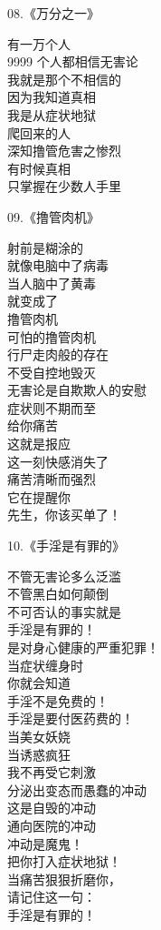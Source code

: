 \begin{multicols}{2}
    \begin{center}
        08.《万分之一》\it

        有一万个人 \\ 9999 个人都相信无害论 \\ 我就是那个不相信的 \\ 因为我知道真相 \\ 我是从症状地狱 \\ 爬回来的人 \\ 深知撸管危害之惨烈 \\ 有时候真相 \\ 只掌握在少数人手里
    \end{center}

    \begin{center}
        09.《撸管肉机》\it

        射前是糊涂的 \\ 就像电脑中了病毒 \\ 当人脑中了黄毒 \\ 就变成了 \\ 撸管肉机 \\ 可怕的撸管肉机 \\ 行尸走肉般的存在 \\ 不受自控地毁灭 \\ 无害论是自欺欺人的安慰 \\ 症状则不期而至 \\ 给你痛苦 \\ 这就是报应 \\ 这一刻快感消失了 \\ 痛苦清晰而强烈 \\ 它在提醒你 \\ 先生，你该买单了！
    \end{center}

    \begin{center}
        10.《手淫是有罪的》\it

        不管无害论多么泛滥 \\ 不管黑白如何颠倒 \\ 不可否认的事实就是 \\ 手淫是有罪的！ \\ 是对身心健康的严重犯罪！ \\ 当症状缠身时 \\ 你就会知道 \\ 手淫不是免费的！ \\ 手淫是要付医药费的！ \\ 当美女妖娆 \\ 当诱惑疯狂 \\ 我不再受它刺激 \\ 分泌出变态而愚蠢的冲动 \\ 这是自毁的冲动 \\ 通向医院的冲动 \\ 冲动是魔鬼！ \\ 把你打入症状地狱！ \\ 当痛苦狠狠折磨你， \\ 请记住这一句： \\ 手淫是有罪的！
    \end{center}
\end{multicols}

